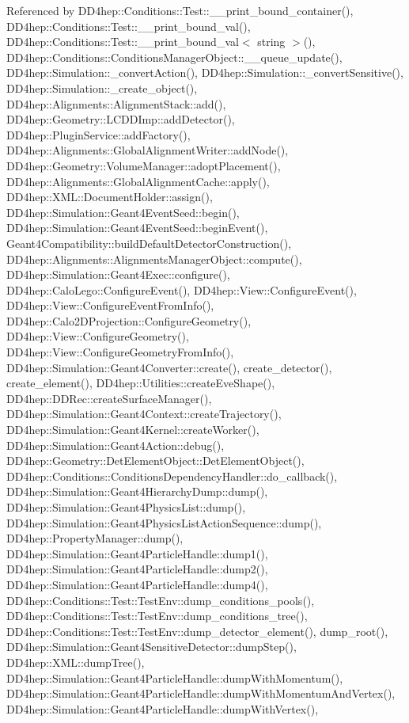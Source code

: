 Referenced by D\+D4hep\+::\+Conditions\+::\+Test\+::\+\_\+\+\_\+print\+\_\+bound\+\_\+container(), D\+D4hep\+::\+Conditions\+::\+Test\+::\+\_\+\+\_\+print\+\_\+bound\+\_\+val(), D\+D4hep\+::\+Conditions\+::\+Test\+::\+\_\+\+\_\+print\+\_\+bound\+\_\+val$<$ string $>$(), D\+D4hep\+::\+Conditions\+::\+Conditions\+Manager\+Object\+::\+\_\+\+\_\+queue\+\_\+update(), D\+D4hep\+::\+Simulation\+::\+\_\+convert\+Action(), D\+D4hep\+::\+Simulation\+::\+\_\+convert\+Sensitive(), D\+D4hep\+::\+Simulation\+::\+\_\+create\+\_\+object(), D\+D4hep\+::\+Alignments\+::\+Alignment\+Stack\+::add(), D\+D4hep\+::\+Geometry\+::\+L\+C\+D\+D\+Imp\+::add\+Detector(), D\+D4hep\+::\+Plugin\+Service\+::add\+Factory(), D\+D4hep\+::\+Alignments\+::\+Global\+Alignment\+Writer\+::add\+Node(), D\+D4hep\+::\+Geometry\+::\+Volume\+Manager\+::adopt\+Placement(), D\+D4hep\+::\+Alignments\+::\+Global\+Alignment\+Cache\+::apply(), D\+D4hep\+::\+X\+M\+L\+::\+Document\+Holder\+::assign(), D\+D4hep\+::\+Simulation\+::\+Geant4\+Event\+Seed\+::begin(), D\+D4hep\+::\+Simulation\+::\+Geant4\+Event\+Seed\+::begin\+Event(), Geant4\+Compatibility\+::build\+Default\+Detector\+Construction(), D\+D4hep\+::\+Alignments\+::\+Alignments\+Manager\+Object\+::compute(), D\+D4hep\+::\+Simulation\+::\+Geant4\+Exec\+::configure(), D\+D4hep\+::\+Calo\+Lego\+::\+Configure\+Event(), D\+D4hep\+::\+View\+::\+Configure\+Event(), D\+D4hep\+::\+View\+::\+Configure\+Event\+From\+Info(), D\+D4hep\+::\+Calo2\+D\+Projection\+::\+Configure\+Geometry(), D\+D4hep\+::\+View\+::\+Configure\+Geometry(), D\+D4hep\+::\+View\+::\+Configure\+Geometry\+From\+Info(), D\+D4hep\+::\+Simulation\+::\+Geant4\+Converter\+::create(), create\+\_\+detector(), create\+\_\+element(), D\+D4hep\+::\+Utilities\+::create\+Eve\+Shape(), D\+D4hep\+::\+D\+D\+Rec\+::create\+Surface\+Manager(), D\+D4hep\+::\+Simulation\+::\+Geant4\+Context\+::create\+Trajectory(), D\+D4hep\+::\+Simulation\+::\+Geant4\+Kernel\+::create\+Worker(), D\+D4hep\+::\+Simulation\+::\+Geant4\+Action\+::debug(), D\+D4hep\+::\+Geometry\+::\+Det\+Element\+Object\+::\+Det\+Element\+Object(), D\+D4hep\+::\+Conditions\+::\+Conditions\+Dependency\+Handler\+::do\+\_\+callback(), D\+D4hep\+::\+Simulation\+::\+Geant4\+Hierarchy\+Dump\+::dump(), D\+D4hep\+::\+Simulation\+::\+Geant4\+Physics\+List\+::dump(), D\+D4hep\+::\+Simulation\+::\+Geant4\+Physics\+List\+Action\+Sequence\+::dump(), D\+D4hep\+::\+Property\+Manager\+::dump(), D\+D4hep\+::\+Simulation\+::\+Geant4\+Particle\+Handle\+::dump1(), D\+D4hep\+::\+Simulation\+::\+Geant4\+Particle\+Handle\+::dump2(), D\+D4hep\+::\+Simulation\+::\+Geant4\+Particle\+Handle\+::dump4(), D\+D4hep\+::\+Conditions\+::\+Test\+::\+Test\+Env\+::dump\+\_\+conditions\+\_\+pools(), D\+D4hep\+::\+Conditions\+::\+Test\+::\+Test\+Env\+::dump\+\_\+conditions\+\_\+tree(), D\+D4hep\+::\+Conditions\+::\+Test\+::\+Test\+Env\+::dump\+\_\+detector\+\_\+element(), dump\+\_\+root(), D\+D4hep\+::\+Simulation\+::\+Geant4\+Sensitive\+Detector\+::dump\+Step(), D\+D4hep\+::\+X\+M\+L\+::dump\+Tree(), D\+D4hep\+::\+Simulation\+::\+Geant4\+Particle\+Handle\+::dump\+With\+Momentum(), D\+D4hep\+::\+Simulation\+::\+Geant4\+Particle\+Handle\+::dump\+With\+Momentum\+And\+Vertex(), D\+D4hep\+::\+Simulation\+::\+Geant4\+Particle\+Handle\+::dump\+With\+Vertex(), 